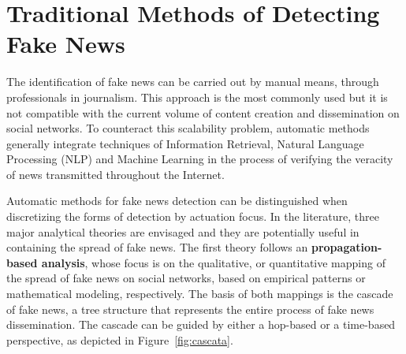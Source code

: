 \documentclass{ieeeaccess}
\begin{document}
\section{Traditional Methods of Detecting Fake News}
\label{sec:metodos}

The identification of fake news can be carried out by manual means, through professionals in journalism. This approach is the most commonly used but it is not compatible with the current volume of content creation and dissemination on social networks. To counteract this scalability problem, automatic methods generally integrate techniques of Information Retrieval, Natural Language Processing (NLP) and Machine Learning in the process of verifying the veracity of news transmitted throughout the Internet.


Automatic methods for fake news detection can be distinguished when discretizing the forms of detection by actuation focus. In the literature, three major analytical theories are envisaged and they are potentially useful in containing the spread of fake news. The first theory follows an \textbf{propagation-based analysis}, whose focus is on the qualitative, or quantitative mapping of the spread of fake news on social networks, based on empirical patterns or mathematical modeling, respectively. The basis of both mappings is the cascade of fake news, a tree structure that represents the entire process of fake news dissemination. The cascade can be guided by either a hop-based or a time-based perspective, as depicted in Figure~\ref{fig:cascata}. %

\end{document}
